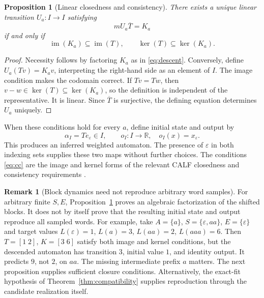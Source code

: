 \documentclass[11pt]{article}
\newtheorem{proposition}[theorem]{Proposition}
\theoremstyle{definition}
\newtheorem{remark}[theorem]{Remark}
\newcommand{\R}{\mathbb R}
\newcommand{\im}{\operatorname{im}}
\begin{document}
\begin{proposition}[Linear closedness and consistency]\label{prop:descent}
There exists a unique linear transition $U_a:I\to I$ satisfying
\begin{equation}\label{eq:descent}
mU_a\overline T=K_a
\end{equation}
if and only if
\begin{equation}\label{eq:cc}
\im(K_a)\subseteq\im(T),\qquad \ker(T)\subseteq\ker(K_a).
\end{equation}
\end{proposition}
\begin{proof}
Necessity follows by factoring $K_a$ as in \eqref{eq:descent}. Conversely,
define $U_a(Tv)=K_av$, interpreting the right-hand side as an element of $I$.
The image condition makes the codomain correct. If $Tv=Tw$, then
$v-w\in\ker(T)\subseteq\ker(K_a)$, so the definition is independent of the
representative. It is linear. Since $\overline T$ is surjective, the defining
equation determines $U_a$ uniquely.
\end{proof}

When these conditions hold for every $a$, define initial state and output by
\[
\alpha_I=T e_\varepsilon\in I,
\qquad o_I:I\to\R,\quad o_I(x)=x_\varepsilon.
\]
This produces an inferred weighted automaton. The presence of $\varepsilon$
in both indexing sets supplies these two maps without further choices.
The conditions \eqref{eq:cc} are the image and kernel forms of the relevant
CALF closedness and consistency requirements \cite{calf}.

\begin{remark}[Block dynamics need not reproduce arbitrary word samples]
For arbitrary finite $S,E$, Proposition~\ref{prop:descent} proves an algebraic
factorization of the shifted blocks. It does not by itself prove that the
resulting initial state and output reproduce all sampled words. For example,
take $A=\{a\}$, $S=\{\varepsilon,aa\}$, $E=\{\varepsilon\}$ and target
values $L(\varepsilon)=1$, $L(a)=3$, $L(aa)=2$, $L(aaa)=6$. Then
$T=[1\;2]$, $K=[3\;6]$ satisfy both image and kernel conditions, but the
descended automaton has transition $3$, initial value $1$, and identity
output. It predicts $9$, not $2$, on $aa$. The missing intermediate prefix
$a$ matters. The next proposition supplies sufficient closure conditions.
Alternatively, the exact-fit hypothesis of
Theorem~\ref{thm:compatibility} supplies reproduction through the candidate
realization itself.
\end{remark}
\end{document}
